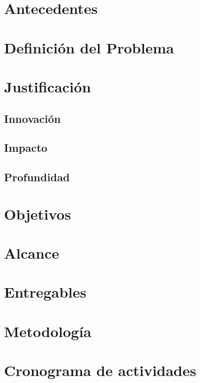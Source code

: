 \documentclass[12pt, twoside]{report}
\begin{document}
\chapter{Antecedentes}


\chapter{Definición del Problema}


\chapter{Justificación}
\section{Innovación}
\section{Impacto}
\section{Profundidad}

\chapter{Objetivos}


\chapter{Alcance}

\chapter{Entregables}

\chapter{Metodología}

\chapter{Cronograma de actividades}



\end{document}

